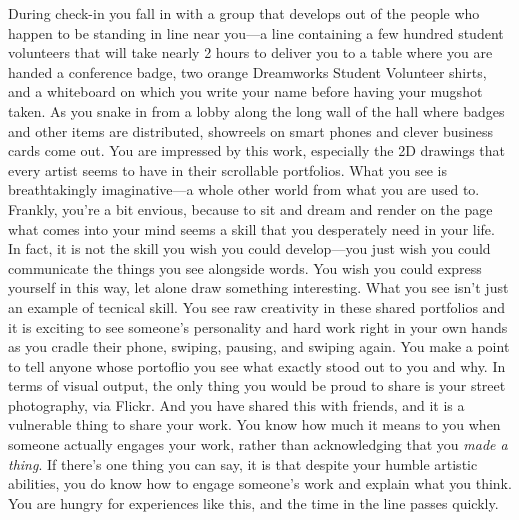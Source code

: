 \documentclass[../main.tex]{subfiles}
\begin{document}
During check-in you fall in with a group that develops out of the people who happen to be standing in line near you---a line containing a few hundred student volunteers that will take nearly 2 hours to deliver you to a table where you are handed a conference badge, two orange Dreamworks Student Volunteer shirts, and a whiteboard on which you write your name before having your mugshot taken. As you snake in from a lobby along the long wall of the hall where badges and other items are distributed, showreels on smart phones and clever business cards come out. You are impressed by this work, especially the 2D drawings that every artist seems to have in their scrollable portfolios. What you see is breathtakingly imaginative---a whole other world from what you are used to. Frankly, you're a bit envious, because to sit and dream and render on the page what comes into your mind seems a skill that you desperately need in your life. In fact, it is not the skill you wish you could develop---you just wish you could communicate the things you see alongside words. You wish you could express yourself in this way, let alone draw something interesting. What you see isn't just an example of tecnical skill. You see raw creativity in these shared portfolios and it is exciting to see someone's personality and hard work right in your own hands as you cradle their phone, swiping, pausing, and swiping again. You make a point to tell anyone whose portoflio you see what exactly stood out to you and why. In terms of visual output, the only thing you would be proud to share is your street photography, via Flickr. And you have shared this with friends, and it is a vulnerable thing to share your work. You know how much it means to you when someone actually engages your work, rather than acknowledging that you \textit{made a thing}. If there's one thing you can say, it is that despite your humble artistic abilities, you do know how to engage someone's work and explain what you think. You are hungry for experiences like this, and the time in the line passes quickly.
\end{document}

